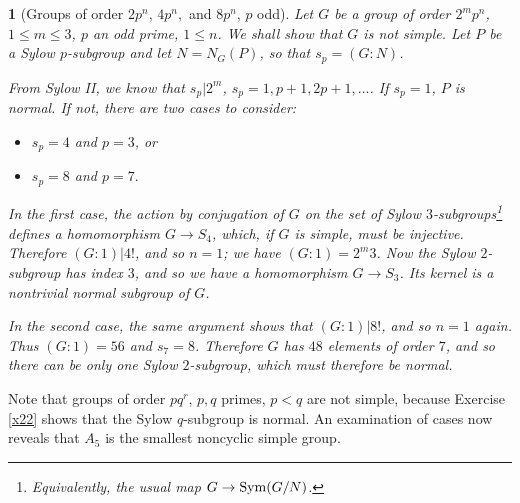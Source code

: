 \documentclass[a4paper,11pt,final,openany]{memoir}%
\newtheorem{plain}[X]{}
\theoremstyle{nonumberplain}
\begin{document}
\begin{plain}
[Groups of order $2p^{n}$, $4p^{n},$ and $8p^{n}$, $p$ odd]\label{st20}%
%
Let $G$ be a group of order $2^{m}p^{n}$, $1\leq m\leq3$, $p$ an odd prime,
$1\leq n$. We shall show that $G$ is not simple. Let $P$ be a Sylow
$p$-subgroup and let $N=N_{G}(P)$, so that $s_{p}=(G:N)$.

From Sylow II, we know that $s_{p}|2^{m}$, $s_{p}=1,p+1,2p+1,\ldots$. If
$s_{p}=1$, $P$ is normal. If not, there are two cases to consider:

\begin{itemize}
\item[(i)] $s_{p}=4$ and $p=3$, or

\item[(ii)] $s_{p}=8$ and $p=7.$
\end{itemize}

In the first case, the action by conjugation of $G$ on the set of Sylow
$3$-subgroups\footnote{Equivalently, the usual map $G\rightarrow\operatorname{Sym}(G/N)$.}
defines a homomorphism $G\rightarrow S_{4}$, which, if $G$ is simple, must be
injective. Therefore $(G:1)|4!$, and so $n=1$; we have $(G:1)=2^{m}3$. Now the
Sylow $2$-subgroup has index $3$, and so we have a homomorphism $G\rightarrow
S_{3}$. Its kernel is a nontrivial normal subgroup of $G$.

In the second case, the same argument shows that $(G:1)|8!$, and so $n=1$
again. Thus $(G:1)=56$ and $s_{7}=8$. Therefore $G$ has $48$ elements of order
$7$, and so there can be only one Sylow $2$-subgroup, which must therefore be normal.
\end{plain}

Note that groups of order $pq^{r}$, $p,q$ primes, $p<q$ are not simple,
because Exercise \ref{x22} shows that the Sylow $q$-subgroup is normal. An
examination of cases now reveals that $A_{5}$ is the smallest noncyclic simple group.
\end{document}
